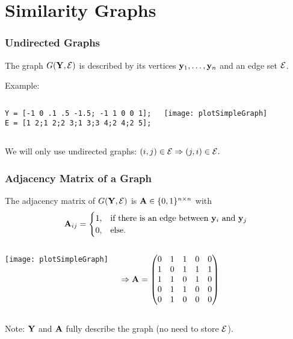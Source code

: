 \documentclass[12pt,handout]{beamer}
\begin{document}
\section{Similarity Graphs} %
\label{sec:graph_models}
\begin{frame}[fragile]
\frametitle{Undirected Graphs}

The graph $G({\bf Y},\cal E)$ is described by its vertices ${\bf y}_1, \ldots, {\bf y}_{n}$ and an edge set $\cal E$.

\bigskip

Example: 
\begin{columns}
\begin{verbatim}
Y = [-1 0 .1 .5 -1.5; -1 1 0 0 1];
E = [1 2;1 2;2 3;1 3;3 4;2 4;2 5];
\end{verbatim}
\texttt{[image: plotSimpleGraph]}
\end{columns}

\bigskip


We will only use undirected graphs:  $(i,j) \in {\cal E} \Rightarrow (j,i) \in {\cal E}.$

\end{frame}


\begin{frame}
\frametitle{Adjacency Matrix of a Graph}

The adjacency matrix of $G({\bf Y},\cal E)$ is  ${\bf A} \in \{0,1\}^{n \times n}$ with
\begin{equation*}
{\bf A}_{ij} = 	\begin{cases}
	 1, & \text{if  there is an  edge between ${\bf y}_i$ and ${\bf y}_j$} \\
	 0, & \text{else}.
	 \end{cases}
\end{equation*}

\begin{columns}
	\texttt{[image: plotSimpleGraph]}
	
	$ \Rightarrow {\bf A} = \begin{pmatrix} 0 & 1 & 1 & 0 & 0 \\
	                         1 & 0 & 1 & 1 & 1 \\
	                         1 & 1 & 0 & 1 & 0 \\
	                         0 & 1 & 1 & 0 & 0 \\
	                         0 & 1 & 0 & 0 & 0 \end{pmatrix} $
\end{columns}

\begin{center}
Note: ${\bf Y}$ and ${\bf A}$ fully describe the graph (no need to store $\cal E$).	
\end{center}
\end{frame}
\end{document}
